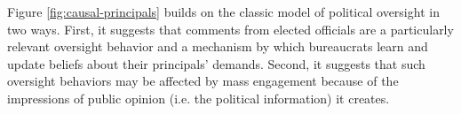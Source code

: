 

Figure \ref{fig:causal-principals} builds on the classic model of political oversight in two ways. First, it suggests that comments from elected officials are a particularly relevant oversight behavior and a mechanism by which bureaucrats learn and update beliefs about their principals' demands. Second, it suggests that such oversight behaviors may be affected by mass engagement because of the impressions of public opinion (i.e. the political information) it creates.